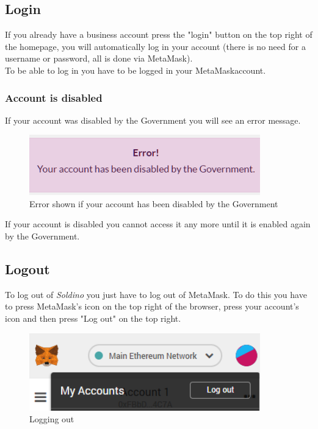 	\subsection{Login}
	If you already have a business account press the "login" button on the 
	top right of the homepage, you will automatically log in your account 
	(there is no need for a username or password, all is done via MetaMask). 
	\\To be able to log in you have to be logged in your MetaMask\glosp account.
		\subsubsection{Account is disabled}
		If your account was disabled by the Government you will see an error 
		message.
		\begin{figure}[H]
			\includegraphics[width=10cm]{res/images/user_disabled.png}
			\centering
			\caption{Error shown if your account has been disabled by the Government}
		\end{figure}
	\noindent If your account is disabled you cannot access it any more until it 
	is enabled again by the Government.
	\subsection{Logout}
	To log out of \textit{Soldino} you just have to log out of 
	MetaMask\glosp. To do this you have to press MetaMask's icon on the top 
	right of the browser, press your account's icon and then press "Log out"
	on the top right.
	\begin{figure}[H]
		\includegraphics[width=10cm]{res/images/logout_metamask.png}
		\centering
		\caption{Logging out}
	\end{figure}
